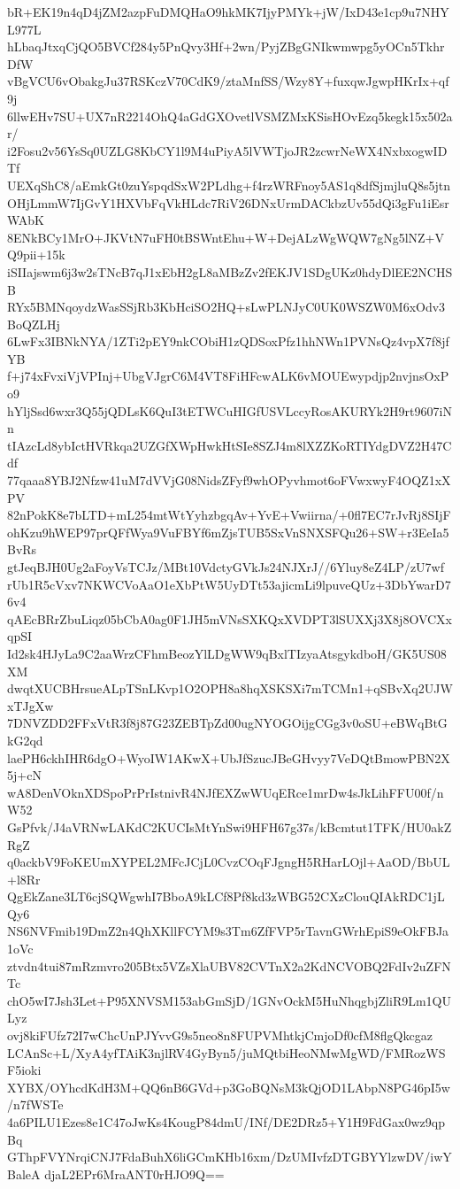bR+EK19n4qD4jZM2azpFuDMQHaO9hkMK7IjyPMYk+jW/IxD43e1cp9u7NHYL977L
hLbaqJtxqCjQO5BVCf284y5PnQvy3Hf+2wn/PyjZBgGNIkwmwpg5yOCn5TkhrDfW
vBgVCU6vObakgJu37RSKczV70CdK9/ztaMnfSS/Wzy8Y+fuxqwJgwpHKrIx+qf9j
6llwEHv7SU+UX7nR2214OhQ4aGdGXOvetlVSMZMxKSisHOvEzq5kegk15x502ar/
i2Fosu2v56YsSq0UZLG8KbCY1l9M4uPiyA5lVWTjoJR2zcwrNeWX4NxbxogwIDTf
UEXqShC8/aEmkGt0zuYspqdSxW2PLdhg+f4rzWRFnoy5AS1q8dfSjmjluQ8s5jtn
OHjLmmW7IjGvY1HXVbFqVkHLdc7RiV26DNxUrmDACkbzUv55dQi3gFu1iEsrWAbK
8ENkBCy1MrO+JKVtN7uFH0tBSWntEhu+W+DejALzWgWQW7gNg5lNZ+VQ9pii+15k
iSIIajswm6j3w2sTNcB7qJ1xEbH2gL8aMBzZv2fEKJV1SDgUKz0hdyDlEE2NCHSB
RYx5BMNqoydzWasSSjRb3KbHciSO2HQ+sLwPLNJyC0UK0WSZW0M6xOdv3BoQZLHj
6LwFx3IBNkNYA/1ZTi2pEY9nkCObiH1zQDSoxPfz1hhNWn1PVNsQz4vpX7f8jfYB
f+j74xFvxiVjVPInj+UbgVJgrC6M4VT8FiHFcwALK6vMOUEwypdjp2nvjnsOxPo9
hYljSsd6wxr3Q55jQDLsK6QuI3tETWCuHIGfUSVLccyRosAKURYk2H9rt9607iNn
tIAzcLd8ybIctHVRkqa2UZGfXWpHwkHtSIe8SZJ4m8lXZZKoRTIYdgDVZ2H47Cdf
77qaaa8YBJ2Nfzw41uM7dVVjG08NidsZFyf9whOPyvhmot6oFVwxwyF4OQZ1xXPV
82nPokK8e7bLTD+mL254mtWtYyhzbgqAv+YvE+Vwiirna/+0fl7EC7rJvRj8SIjF
ohKzu9hWEP97prQFfWya9VuFBYf6mZjsTUB5SxVnSNXSFQu26+SW+r3EeIa5BvRs
gtJeqBJH0Ug2aFoyVsTCJz/MBt10VdctyGVkJs24NJXrJ//6Yluy8eZ4LP/zU7wf
rUb1R5cVxv7NKWCVoAaO1eXbPtW5UyDTt53ajicmLi9lpuveQUz+3DbYwarD76v4
qAEcBRrZbuLiqz05bCbA0ag0F1JH5mVNsSXKQxXVDPT3lSUXXj3X8j8OVCXxqpSI
Id2sk4HJyLa9C2aaWrzCFhmBeozYlLDgWW9qBxlTIzyaAtsgykdboH/GK5US08XM
dwqtXUCBHrsueALpTSnLKvp1O2OPH8a8hqXSKSXi7mTCMn1+qSBvXq2UJWxTJgXw
7DNVZDD2FFxVtR3f8j87G23ZEBTpZd00ugNYOGOijgCGg3v0oSU+eBWqBtGkG2qd
laePH6ckhIHR6dgO+WyoIW1AKwX+UbJfSzucJBeGHvyy7VeDQtBmowPBN2X5j+cN
wA8DenVOknXDSpoPrPrIstnivR4NJfEXZwWUqERce1mrDw4sJkLihFFU00f/nW52
GsPfvk/J4aVRNwLAKdC2KUCIsMtYnSwi9HFH67g37s/kBcmtut1TFK/HU0akZRgZ
q0ackbV9FoKEUmXYPEL2MFcJCjL0CvzCOqFJgngH5RHarLOjl+AaOD/BbUL+l8Rr
QgEkZane3LT6cjSQWgwhI7BboA9kLCf8Pf8kd3zWBG52CXzClouQIAkRDC1jLQy6
NS6NVFmib19DmZ2n4QhXKllFCYM9s3Tm6ZfFVP5rTavnGWrhEpiS9eOkFBJa1oVc
ztvdn4tui87mRzmvro205Btx5VZsXlaUBV82CVTnX2a2KdNCVOBQ2FdIv2uZFNTc
chO5wI7Jsh3Let+P95XNVSM153abGmSjD/1GNvOckM5HuNhqgbjZliR9Lm1QULyz
ovj8kiFUfz72I7wChcUnPJYvvG9s5neo8n8FUPVMhtkjCmjoDf0cfM8flgQkcgaz
LCAnSc+L/XyA4yfTAiK3njlRV4GyByn5/juMQtbiHeoNMwMgWD/FMRozWSF5ioki
XYBX/OYhcdKdH3M+QQ6nB6GVd+p3GoBQNsM3kQjOD1LAbpN8PG46pI5w/n7fWSTe
4a6PILU1Ezes8e1C47oJwKs4KougP84dmU/INf/DE2DRz5+Y1H9FdGax0wz9qpBq
GThpFVYNrqiCNJ7FdaBuhX6liGCmKHb16xm/DzUMIvfzDTGBYYlzwDV/iwYBaleA
djaL2EPr6MraANT0rHJO9Q==
